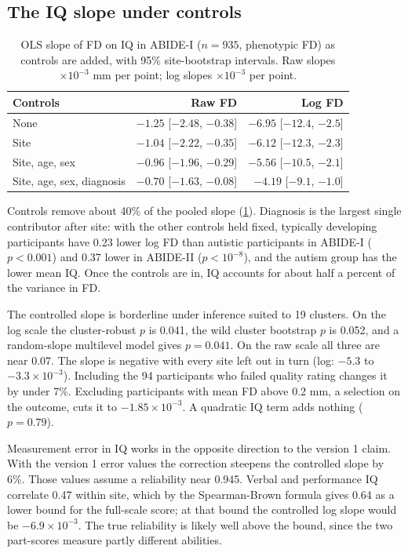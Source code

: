 \documentclass[11pt,a4paper]{article}
\begin{document}
\subsection{The IQ slope under controls}

\begin{table}[H]
\centering
\caption{OLS slope of FD on IQ in ABIDE-I ($n = 935$, phenotypic FD) as controls are added, with 95\% site-bootstrap intervals. Raw slopes $\times 10^{-3}$ mm per point; log slopes $\times 10^{-3}$ per point.}
\label{tab:ladder}
\begin{tabular}{lrr}
\toprule
Controls & Raw FD & Log FD \\
\midrule
None & $-1.25$ [$-2.48$, $-0.38$] & $-6.95$ [$-12.4$, $-2.5$] \\
Site & $-1.04$ [$-2.22$, $-0.35$] & $-6.12$ [$-12.3$, $-2.3$] \\
Site, age, sex & $-0.96$ [$-1.96$, $-0.29$] & $-5.56$ [$-10.5$, $-2.1$] \\
Site, age, sex, diagnosis & $-0.70$ [$-1.63$, $-0.08$] & $-4.19$ [$-9.1$, $-1.0$] \\
\bottomrule
\end{tabular}
\end{table}

Controls remove about 40\% of the pooled slope (\cref{tab:ladder}). Diagnosis is the largest single contributor after site: with the other controls held fixed, typically developing participants have 0.23 lower log FD than autistic participants in ABIDE-I ($p < 0.001$) and 0.37 lower in ABIDE-II ($p < 10^{-8}$), and the autism group has the lower mean IQ. Once the controls are in, IQ accounts for about half a percent of the variance in FD.

The controlled slope is borderline under inference suited to 19 clusters. On the log scale the cluster-robust $p$ is 0.041, the wild cluster bootstrap $p$ is 0.052, and a random-slope multilevel model gives $p = 0.041$. On the raw scale all three are near 0.07. The slope is negative with every site left out in turn (log: $-5.3$ to $-3.3 \times 10^{-3}$). Including the 94 participants who failed quality rating changes it by under 7\%. Excluding participants with mean FD above 0.2 mm, a selection on the outcome, cuts it to $-1.85 \times 10^{-3}$. A quadratic IQ term adds nothing ($p = 0.79$).

Measurement error in IQ works in the opposite direction to the version 1 claim. With the version 1 error values the correction steepens the controlled slope by 6\%. Those values assume a reliability near 0.945. Verbal and performance IQ correlate 0.47 within site, which by the Spearman-Brown formula gives 0.64 as a lower bound for the full-scale score; at that bound the controlled log slope would be $-6.9 \times 10^{-3}$. The true reliability is likely well above the bound, since the two part-scores measure partly different abilities.
\end{document}
